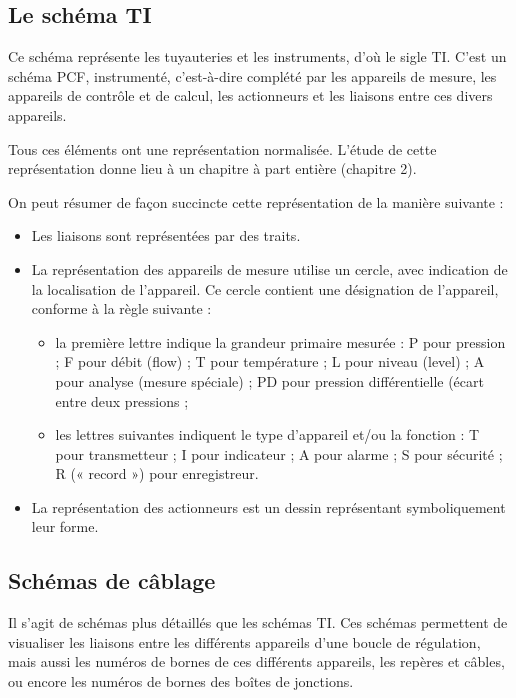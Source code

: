 \subsection{Le schéma TI}

Ce schéma représente les tuyauteries et les instruments, d’où le sigle TI. C’est un schéma PCF, instrumenté, c’est-à-dire complété par les appareils de mesure, les appareils de contrôle et de calcul, les actionneurs et les liaisons entre ces divers appareils.
\vspace{0.3cm}

Tous ces éléments ont une représentation normalisée. L’étude de cette représentation donne lieu à un chapitre à part entière (chapitre 2). 
\vspace{0.3cm}

On peut résumer de façon succincte cette représentation de la manière suivante :


 \begin{itemize}
\item Les liaisons sont représentées par des traits.
\item La représentation des appareils de mesure utilise un cercle, avec indication de la localisation de l’appareil. Ce cercle contient une désignation de l’appareil, conforme à la règle suivante :


 \begin{itemize}
\item la première lettre indique la grandeur primaire mesurée : P pour pression ; F pour débit (flow) ; T pour température ; L pour niveau (level) ; A pour analyse (mesure spéciale) ; PD pour pression différentielle (écart entre deux pressions ;
	\item les lettres suivantes indiquent le type d’appareil et/ou la fonction : T pour transmetteur ; I pour indicateur ; A pour alarme ; S pour sécurité ; R (« record ») pour 
enregistreur.

\end{itemize}

\item La représentation des actionneurs est un dessin représentant symboliquement leur forme.

\end{itemize}


\subsection{	Schémas de câblage} 

Il s’agit de schémas plus détaillés que les schémas TI. Ces schémas permettent de visualiser les liaisons entre les différents appareils d’une boucle de régulation, mais aussi les numéros de bornes de ces différents appareils, les repères et câbles, ou encore les numéros de bornes des boîtes de jonctions.



